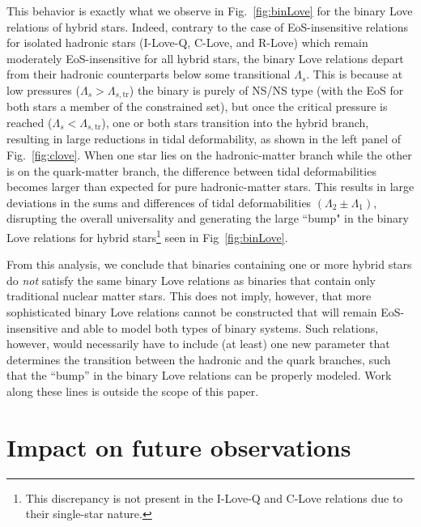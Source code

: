 \documentclass[prd,twocolumn,nofootinbib,superscriptaddress,amsmath,amssymb]{revtex4-1}
\begin{document}
This behavior is exactly what we observe in Fig.~\ref{fig:binLove} for the binary Love relations of hybrid stars. Indeed, contrary to the case of EoS-insensitive relations for isolated hadronic stars (I-Love-Q, C-Love, and R-Love) which remain moderately EoS-insensitive for all hybrid stars, the binary Love relations depart from their hadronic counterparts below some transitional $\Lambda_{s}$. This is because at low pressures ($\Lambda_s>\Lambda_{s,\textrm{tr}}$) the binary is purely of NS/NS type (with the EoS for both stars a member of the constrained set), but once the critical pressure is reached ($\Lambda_{s}<\Lambda_{s,\textrm{tr}}$), one or both stars transition into the hybrid branch, resulting in large reductions in tidal deformability, as shown in the left panel of Fig.~\ref{fig:clove}. When one star lies on the hadronic-matter branch while the other is on the quark-matter branch, the difference between tidal deformabilities becomes larger than expected for pure hadronic-matter stars. This results in large deviations in the sums and differences of tidal deformabilities $(\Lambda_2 \pm \Lambda_1)$, disrupting the overall universality and generating the large ``bump" in the binary Love relations for hybrid stars\footnote{This discrepancy is not present in the I-Love-Q and C-Love relations due to their single-star nature.} seen in Fig~\ref{fig:binLove}.

From this analysis, we conclude that binaries containing one or more hybrid stars do \emph{not} satisfy the same binary Love relations as binaries that contain only traditional nuclear matter stars. This does not imply, however, that more sophisticated binary Love relations cannot be constructed that will remain EoS-insensitive and able to model both types of binary systems. Such relations, however, would necessarily have to include (at least) one new parameter that determines the transition between the hadronic and the quark branches, such that the ``bump'' in the binary Love relations can be properly modeled. Work along these lines is outside the scope of this paper. 



\section{Impact on future observations}
\label{sec:observations}
\end{document}
